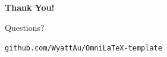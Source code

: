 \documentclass[
    language=english,
    doctype=presentation,
    institution=none,
]{../../omnilatex}
\begin{document}

\begin{presentationframe}
    \vfill
    \begin{center}
        {\Huge\bfseries\color{universityprimary}Thank You!}\par
        \vspace{8mm}
        {\Large Questions?}\par
        \vspace{6mm}
        {\normalsize\texttt{github.com/WyattAu/OmniLaTeX-template}}
    \end{center}
    \vfill
\end{presentationframe}
\end{document}
